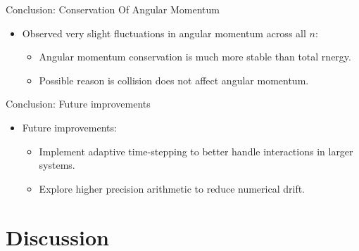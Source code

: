 \documentclass[10pt, xcolor = svgnames, aspectratio=43]{beamer} %
\begin{document}
\begin{frame}{Conclusion: Conservation Of Angular Momentum}
\begin{itemize}
    \item Observed very slight fluctuations in angular momentum across all $n$:
    \begin{itemize}
        \item Angular momentum conservation is much more stable than total rnergy.
        \item Possible reason is collision does not affect angular momentum.
    \end{itemize}
\end{itemize}
\end{frame}


\begin{frame}{Conclusion: Future improvements}
\begin{itemize}
    \item Future improvements:
    \begin{itemize}
        \item Implement adaptive time-stepping to better handle interactions in larger systems.
        \item Explore higher precision arithmetic to reduce numerical drift.
    \end{itemize}
\end{itemize}
\end{frame}







\section{Discussion}
\end{document}
